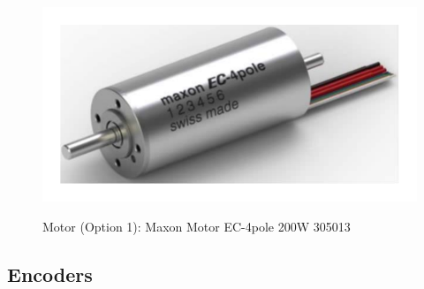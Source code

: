 \begin{figure}
  \centering
  \includegraphics[angle=90,width=1\columnwidth]{figs/body02/FIGDEVICEMOTOROPTION1.pdf}\\
  \caption[Motor (Option 1): Maxon Motor EC-4pole 200W 305013]{Motor (Option 1): Maxon Motor EC-4pole 200W 305013}
  \label{FIG:DEVICEMOTOROPTION1}
\end{figure}
\subsection{Encoders}
